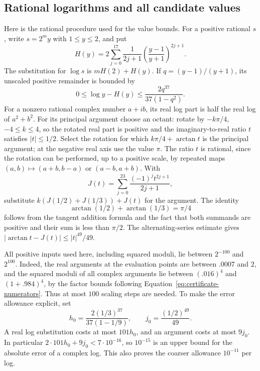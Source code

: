 \subsection{Rational logarithms and all candidate values}
Here is the rational procedure used for the value bounds.  For a positive
rational $s$, write $s=2^m y$ with $1\le y\le2$, and put
\begin{equation}\label{eq:certificate-H}
 H(y)=2\sum_{j=0}^{17}\frac1{2j+1}
               \left(\frac{y-1}{y+1}\right)^{2j+1}.
\end{equation}
The substitution for $\log s$ is $mH(2)+H(y)$.  If
$q=(y-1)/(y+1)$, its unscaled positive remainder is bounded by
\[
 0\le\log y-H(y)\le\frac{2q^{37}}{37(1-q^2)}.
\]
For a nonzero rational complex number $a+ib$, its real log part is half
the real log of $a^2+b^2$.  For its principal argument choose an octant:
rotate by $-k\pi/4$, $-4\le k\le4$, so the rotated real part is positive
and the imaginary-to-real ratio $t$ satisfies $|t|\le1/2$.  Select the
rotation for which $k\pi/4+\arctan t$ is the principal argument; at the
negative real axis use the value $\pi$.  The ratio $t$ is rational, since
the rotation can be performed, up to a positive scale, by repeated maps
$(a,b)\mapsto(a+b,b-a)$ or $(a-b,a+b)$.
With
\begin{equation}\label{eq:certificate-J}
 J(t)=\sum_{j=0}^{23}\frac{(-1)^jt^{2j+1}}{2j+1},
\end{equation}
substitute $k(J(1/2)+J(1/3))+J(t)$ for the argument.  The identity
\[
 \arctan(1/2)+\arctan(1/3)=\pi/4
\]
follows from the tangent addition
formula and the fact that both summands are positive and their sum is
less than $\pi/2$.  The alternating-series estimate gives
$|\arctan t-J(t)|\le |t|^{49}/49$.

All positive inputs used here, including squared moduli, lie between
$2^{-100}$ and $2^{100}$.  Indeed, the real arguments at the evaluation
points are between $.0007$ and $2$, and the squared moduli of all complex
arguments lie between $(.016)^4$ and $(1+.984)^4$, by the factor bounds
following Equation~\eqref{eq:certificate-numerators}.
Thus at most $100$ scaling steps are needed.  To make the error allowance
explicit, set
\[
 h_0=\frac{2(1/3)^{37}}{37(1-1/9)},\qquad
 j_0=\frac{(1/2)^{49}}{49}.
\]
A real log substitution costs at most $101h_0$, and an argument costs
at most $9j_0$.  In particular
$2\cdot101h_0+9j_0<7\cdot10^{-16}$, so $10^{-15}$ is an upper
bound for the absolute error of a complex log.  This also proves the
coarser allowance $10^{-11}$ per log.

